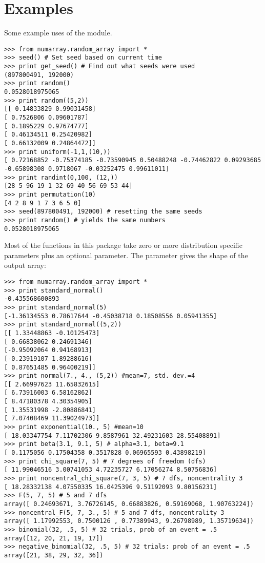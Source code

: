 \section{Examples}
\label{sec:examples}

Some example uses of the  module.  
\begin{verbatim}
>>> from numarray.random_array import *
>>> seed() # Set seed based on current time
>>> print get_seed() # Find out what seeds were used
(897800491, 192000)
>>> print random()
0.0528018975065
>>> print random((5,2))
[[ 0.14833829 0.99031458]
[ 0.7526806 0.09601787]
[ 0.1895229 0.97674777]
[ 0.46134511 0.25420982]
[ 0.66132009 0.24864472]]
>>> print uniform(-1,1,(10,))
[ 0.72168852 -0.75374185 -0.73590945 0.50488248 -0.74462822 0.09293685
-0.65898308 0.9718067 -0.03252475 0.99611011]
>>> print randint(0,100, (12,))
[28 5 96 19 1 32 69 40 56 69 53 44]
>>> print permutation(10)
[4 2 8 9 1 7 3 6 5 0]
>>> seed(897800491, 192000) # resetting the same seeds
>>> print random() # yields the same numbers
0.0528018975065
\end{verbatim}
Most of the functions in this package take zero or more distribution specific
parameters plus an optional  parameter. The  parameter
gives the shape of the output array:
\begin{verbatim}
>>> from numarray.random_array import *
>>> print standard_normal()
-0.435568600893
>>> print standard_normal(5)
[-1.36134553 0.78617644 -0.45038718 0.18508556 0.05941355]
>>> print standard_normal((5,2))
[[ 1.33448863 -0.10125473]
[ 0.66838062 0.24691346]
[-0.95092064 0.94168913]
[-0.23919107 1.89288616]
[ 0.87651485 0.96400219]]
>>> print normal(7., 4., (5,2)) #mean=7, std. dev.=4
[[ 2.66997623 11.65832615]
[ 6.73916003 6.58162862]
[ 8.47180378 4.30354905]
[ 1.35531998 -2.80886841]
[ 7.07408469 11.39024973]]
>>> print exponential(10., 5) #mean=10
[ 18.03347754 7.11702306 9.8587961 32.49231603 28.55408891]
>>> print beta(3.1, 9.1, 5) # alpha=3.1, beta=9.1
[ 0.1175056 0.17504358 0.3517828 0.06965593 0.43898219]
>>> print chi_square(7, 5) # 7 degrees of freedom (dfs)
[ 11.99046516 3.00741053 4.72235727 6.17056274 8.50756836]
>>> print noncentral_chi_square(7, 3, 5) # 7 dfs, noncentrality 3
[ 18.28332138 4.07550335 16.0425396 9.51192093 9.80156231]
>>> F(5, 7, 5) # 5 and 7 dfs
array([ 0.24693671, 3.76726145, 0.66883826, 0.59169068, 1.90763224])
>>> noncentral_F(5, 7, 3., 5) # 5 and 7 dfs, noncentrality 3
array([ 1.17992553, 0.7500126 , 0.77389943, 9.26798989, 1.35719634])
>>> binomial(32, .5, 5) # 32 trials, prob of an event = .5
array([12, 20, 21, 19, 17])
>>> negative_binomial(32, .5, 5) # 32 trials: prob of an event = .5
array([21, 38, 29, 32, 36])
\end{verbatim}
